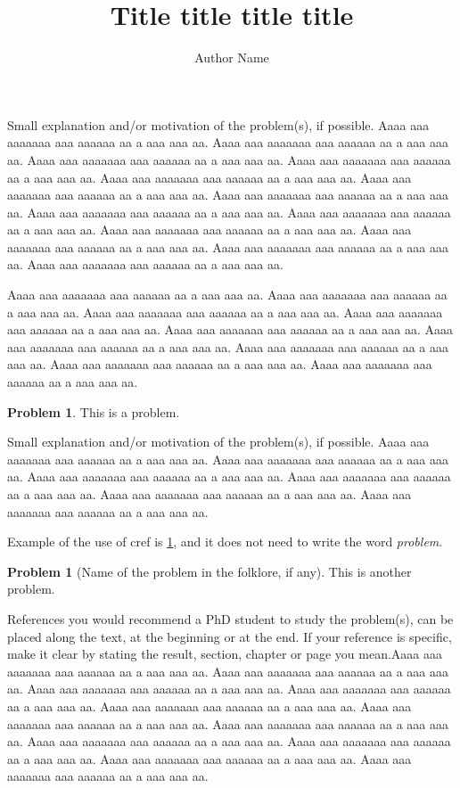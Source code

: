 \documentclass[a4paper,11pt]{amsart}
\theoremstyle{plain}
\theoremstyle{definition}
\newtheorem{problem}[theorem]{Problem}
\begin{document}
\author{Author Name}
\title{Title title title title}


\maketitle


Small explanation and/or motivation of the problem(s), if possible. \textcolor[rgb]{0.4,0.4,0.4}{Aaaa aaa aaaaaaa aaa aaaaaa aa a aaa aaa aa. Aaaa aaa aaaaaaa aaa aaaaaa aa a aaa aaa aa. Aaaa aaa aaaaaaa aaa aaaaaa aa a aaa aaa aa. Aaaa aaa aaaaaaa aaa aaaaaa aa a aaa aaa aa. Aaaa aaa aaaaaaa aaa aaaaaa aa a aaa aaa aa. Aaaa aaa aaaaaaa aaa aaaaaa aa a aaa aaa aa. Aaaa aaa aaaaaaa aaa aaaaaa aa a aaa aaa aa. Aaaa aaa aaaaaaa aaa aaaaaa aa a aaa aaa aa. Aaaa aaa aaaaaaa aaa aaaaaa aa a aaa aaa aa. Aaaa aaa aaaaaaa aaa aaaaaa aa a aaa aaa aa. Aaaa aaa aaaaaaa aaa aaaaaa aa a aaa aaa aa. Aaaa aaa aaaaaaa aaa aaaaaa aa a aaa aaa aa. Aaaa aaa aaaaaaa aaa aaaaaa aa a aaa aaa aa.} 

\textcolor[rgb]{0.4,0.4,0.4}{Aaaa aaa aaaaaaa aaa aaaaaa aa a aaa aaa aa. Aaaa aaa aaaaaaa aaa aaaaaa aa a aaa aaa aa. Aaaa aaa aaaaaaa aaa aaaaaa aa a aaa aaa aa. Aaaa aaa aaaaaaa aaa aaaaaa aa a aaa aaa aa. Aaaa aaa aaaaaaa aaa aaaaaa aa a aaa aaa aa. Aaaa aaa aaaaaaa aaa aaaaaa aa a aaa aaa aa. Aaaa aaa aaaaaaa aaa aaaaaa aa a aaa aaa aa. Aaaa aaa aaaaaaa aaa aaaaaa aa a aaa aaa aa. Aaaa aaa aaaaaaa aaa aaaaaa aa a aaa aaa aa.} 

\begin{problem}\label{prob:name}
This is a problem.
\end{problem}

Small explanation and/or motivation of the problem(s), if possible. \textcolor[rgb]{0.4,0.4,0.4}{Aaaa aaa aaaaaaa aaa aaaaaa aa a aaa aaa aa. Aaaa aaa aaaaaaa aaa aaaaaa aa a aaa aaa aa. Aaaa aaa aaaaaaa aaa aaaaaa aa a aaa aaa aa. Aaaa aaa aaaaaaa aaa aaaaaa aa a aaa aaa aa. Aaaa aaa aaaaaaa aaa aaaaaa aa a aaa aaa aa. Aaaa aaa aaaaaaa aaa aaaaaa aa a aaa aaa aa. }

Example of the use of cref is \cref{prob:name}, and it does not need to write the word \textsl{problem}.

\begin{problem}[Name of the problem in the folklore, if any]
This is another problem.
\end{problem}


References you would recommend a PhD student to study the problem(s), can be placed along the text, at the beginning or at the end. If your reference is specific, make it clear by stating the result, section, chapter or page you mean.\textcolor[rgb]{0.4,0.4,0.4}{Aaaa aaa aaaaaaa aaa aaaaaa aa a aaa aaa aa. Aaaa aaa aaaaaaa aaa aaaaaa aa a aaa aaa aa. Aaaa aaa aaaaaaa aaa aaaaaa aa a aaa aaa aa. Aaaa aaa aaaaaaa aaa aaaaaa aa a aaa aaa aa. Aaaa aaa aaaaaaa aaa aaaaaa aa a aaa aaa aa. Aaaa aaa aaaaaaa aaa aaaaaa aa a aaa aaa aa. Aaaa aaa aaaaaaa aaa aaaaaa aa a aaa aaa aa. Aaaa aaa aaaaaaa aaa aaaaaa aa a aaa aaa aa. Aaaa aaa aaaaaaa aaa aaaaaa aa a aaa aaa aa. Aaaa aaa aaaaaaa aaa aaaaaa aa a aaa aaa aa. Aaaa aaa aaaaaaa aaa aaaaaa aa a aaa aaa aa. }
\end{document}
